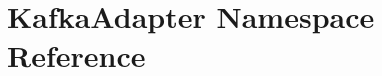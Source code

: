 \hypertarget{namespaceKafkaAdapter}{}\section{Kafka\+Adapter Namespace Reference}
\label{namespaceKafkaAdapter}
